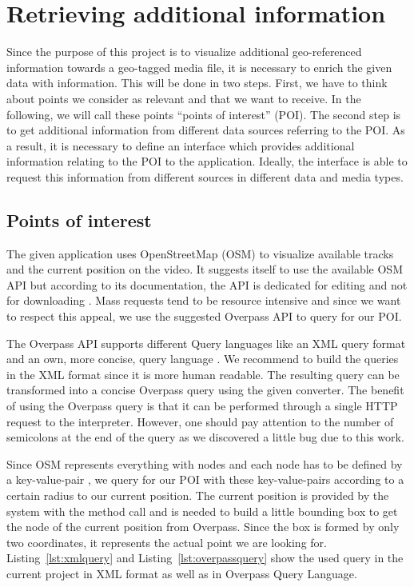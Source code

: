 \documentclass[journal]{IEEEtran}
\begin{document}
\section{Retrieving additional information}

Since the purpose of this project is to visualize additional geo-referenced information towards a geo-tagged media file, it is necessary to enrich the given data with information. This will be done in two steps. First, we have to think about points we consider as relevant and that we want to receive. In the following, we will call these points “points of interest” (POI).  The second step is to get additional information from different data sources referring to the POI. As a result, it is necessary to define an interface which provides additional information relating to the POI to the application. Ideally, the interface is able to request this information from different sources in different data and media types.

\subsection{Points of interest}

The given application uses OpenStreetMap (OSM) to visualize available tracks and the current position on the video. It suggests itself to use the available OSM API but according to its documentation, the API is dedicated for editing and not for downloading \cite{osmdata}. Mass requests tend to be resource intensive and since we want to respect this appeal, we use the suggested Overpass API to query for our POI.

The Overpass API supports different Query languages like an XML query format and an own, more concise, query language \cite{overpass-lang}. We recommend to build the queries in the XML format since it is more human readable. The resulting query can be transformed into a concise Overpass query using the given converter. The benefit of using the Overpass query is that it can be performed through a single HTTP request to the interpreter. However, one should pay attention to the number of semicolons at the end of the query as we discovered a little bug due to this work.

Since OSM represents everything with nodes and each node has to be defined by a key-value-pair \cite{osmfeature}, we query for our POI with these key-value-pairs according to a certain radius to our current position. 
The current position is provided by the system with the method call and is needed to build a little bounding box to get the node of the current position from Overpass. Since the box is formed by only two coordinates, it represents the actual point we are looking for. Listing~\ref{lst:xmlquery} and Listing~\ref{lst:overpassquery} show the used query in the current project in XML format as well as in Overpass Query Language.
\end{document}
